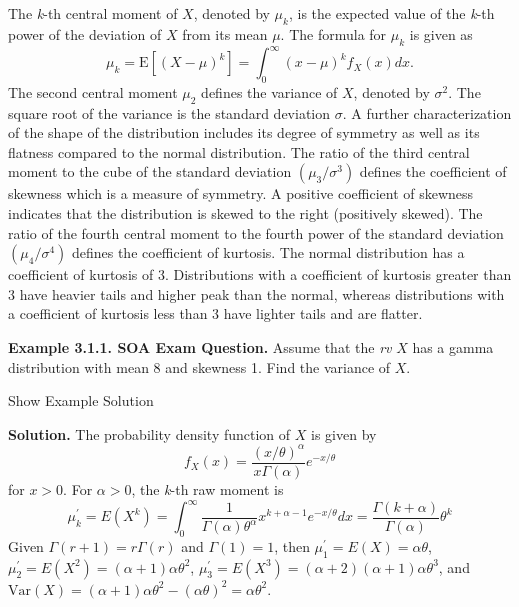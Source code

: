 \documentclass[]{book}
\theoremstyle{definition}
\theoremstyle{definition}
\theoremstyle{definition}
\theoremstyle{remark}
\begin{document}
The \emph{k}-th central moment of \(X\), denoted by \(\mu_{k}\), is the
expected value of the \emph{k}-th power of the deviation of \(X\) from
its mean \(\mu\). The formula for \(\mu_{k}\) is given as
\[\mu_{k} = \mathrm{E}\left\lbrack {(X - \mu)}^{k} \right\rbrack = \int_{0}^{\infty}{\left( x - \mu \right)^{k}f_{X}\left( x \right) dx }.\]
The second central moment \(\mu_{2}\) defines the variance of \(X\),
denoted by \(\sigma^{2}\). The square root of the variance is the
standard deviation \(\sigma\). A further characterization of the shape
of the distribution includes its degree of symmetry as well as its
flatness compared to the normal distribution. The ratio of the third
central moment to the cube of the standard deviation
\(\left( \mu_{3} / \sigma^{3} \right)\) defines the coefficient of
skewness which is a measure of symmetry. A positive coefficient of
skewness indicates that the distribution is skewed to the right
(positively skewed). The ratio of the fourth central moment to the
fourth power of the standard deviation
\(\left(\mu_{4} / \sigma^{4} \right)\) defines the coefficient of
kurtosis. The normal distribution has a coefficient of kurtosis of 3.
Distributions with a coefficient of kurtosis greater than 3 have heavier
tails and higher peak than the normal, whereas distributions with a
coefficient of kurtosis less than 3 have lighter tails and are flatter.

\textbf{Example 3.1.1. SOA Exam Question.} Assume that the \emph{rv}
\(X\) has a gamma distribution with mean 8 and skewness 1. Find the
variance of \(X\).

Show Example Solution

\hypertarget{toggleExampleLoss.1.1}{}
\textbf{Solution.} The probability density function of \(X\) is given by
\[f_{X}\left( x \right) = \frac{\left( x / \theta \right)^{\alpha}}{x\Gamma\left( \alpha \right)} e^{- x / \theta} \]
for \(x > 0\). For \(\alpha>0\), the \emph{k}-th raw moment is
\[\mu_{k}^{\prime} = E\left( X^{k} \right) = \int_{0}^{\infty}{\frac{1}{\Gamma\left( \alpha \right)\theta^{\alpha}}x^{k + \alpha - 1}e^{- x / \theta} dx} = \frac{\Gamma\left( k + \alpha \right)}{\Gamma\left( \alpha \right)}\theta^{k}\]
Given \(\Gamma\left( r + 1 \right) = r\Gamma\left( r \right)\) and
\(\Gamma\left( 1 \right) = 1\), then
\(\mu_{1}^{\prime} = E\left( X \right) = \alpha\theta\),
\(\mu_{2}^{\prime} = E\left( X^{2} \right) = \left( \alpha + 1 \right)\alpha\theta^{2}\),
\(\mu_{3}^{\prime} = E\left( X^{3} \right) = \left( \alpha + 2 \right)\left( \alpha + 1 \right)\alpha\theta^{3}\),
and
\(\mathrm{Var}\left( X \right) = (\alpha + 1)\alpha\theta^2 - (\alpha\theta)^2 = \alpha\theta^{2}\).
\end{document}
